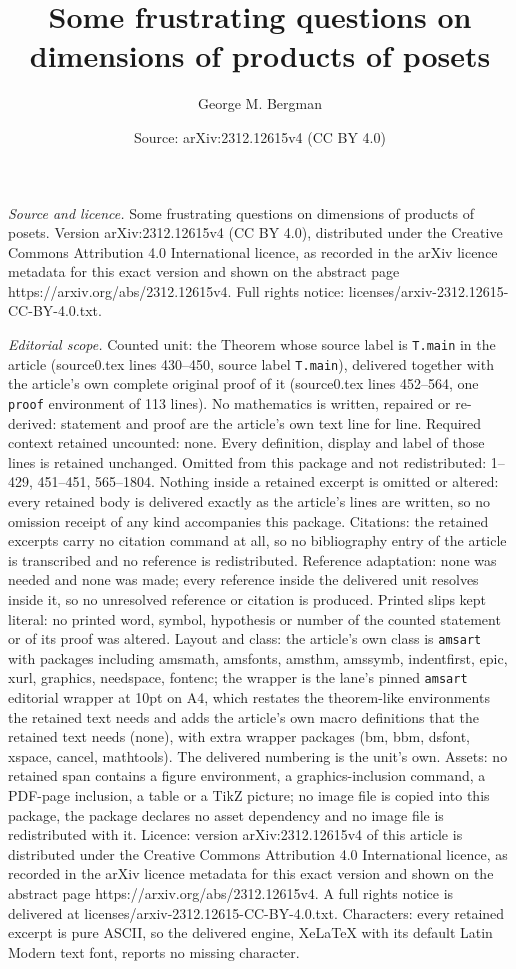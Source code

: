 \documentclass[10pt,a4paper]{amsart}
\title[Some frustrating questions on dimensions of products of pose]{Some frustrating questions on dimensions of products of posets}
\author{George M. Bergman}
\date{Source: arXiv:2312.12615v4 (CC BY 4.0)}
\begin{document}
\maketitle

\noindent\emph{Source and licence.} Some frustrating questions on dimensions of products of posets. Version arXiv:2312.12615v4 (CC BY 4.0), distributed under the Creative Commons Attribution 4.0 International licence, as recorded in the arXiv licence metadata for this exact version and shown on the abstract page https://arxiv.org/abs/2312.12615v4. Full rights notice: licenses/arxiv-2312.12615-CC-BY-4.0.txt.\par\smallskip

\noindent\textit{Editorial scope.} Counted unit: the Theorem whose source label is \texttt{T.main} in the article (source0.tex lines 430--450, source label \texttt{T.main}), delivered together with the article's own complete original proof of it (source0.tex lines 452--564, one \texttt{proof} environment of 113 lines). No mathematics is written, repaired or re-derived: statement and proof are the article's own text line for line. Required context retained uncounted: none. Every definition, display and label of those lines is retained unchanged. Omitted from this package and not redistributed: 1--429, 451--451, 565--1804. Nothing inside a retained excerpt is omitted or altered: every retained body is delivered exactly as the article's lines are written, so no omission receipt of any kind accompanies this package. Citations: the retained excerpts carry no citation command at all, so no bibliography entry of the article is transcribed and no reference is redistributed. Reference adaptation: none was needed and none was made; every reference inside the delivered unit resolves inside it, so no unresolved reference or citation is produced. Printed slips kept literal: no printed word, symbol, hypothesis or number of the counted statement or of its proof was altered. Layout and class: the article's own class is \texttt{amsart} with packages including amsmath, amsfonts, amsthm, amssymb, indentfirst, epic, xurl, graphics, needspace, fontenc; the wrapper is the lane's pinned \texttt{amsart} editorial wrapper at 10pt on A4, which restates the theorem-like environments the retained text needs and adds the article's own macro definitions that the retained text needs (none), with extra wrapper packages (bm, bbm, dsfont, xspace, cancel, mathtools). The delivered numbering is the unit's own. Assets: no retained span contains a figure environment, a graphics-inclusion command, a PDF-page inclusion, a table or a TikZ picture; no image file is copied into this package, the package declares no asset dependency and no image file is redistributed with it. Licence: version arXiv:2312.12615v4 of this article is distributed under the Creative Commons Attribution 4.0 International licence, as recorded in the arXiv licence metadata for this exact version and shown on the abstract page https://arxiv.org/abs/2312.12615v4. A full rights notice is delivered at licenses/arxiv-2312.12615-CC-BY-4.0.txt. Characters: every retained excerpt is pure ASCII, so the delivered engine, XeLaTeX with its default Latin Modern text font, reports no missing character.
\end{document}
